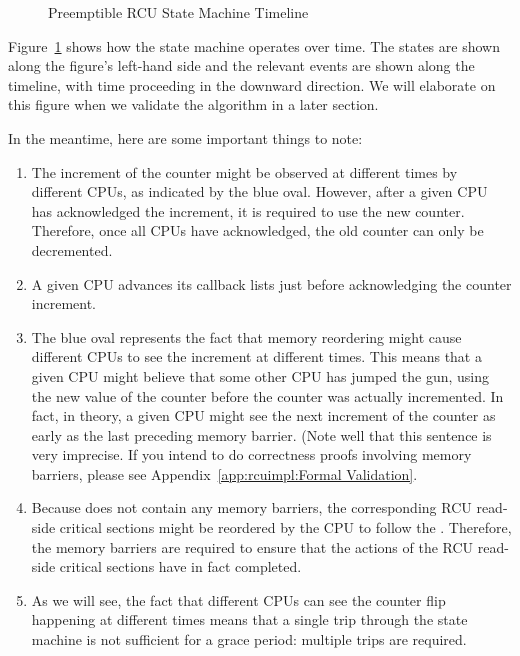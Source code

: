 \begin{figure}[htb]
\centering
{}
\caption{Preemptible RCU State Machine Timeline}
\label{app:rcuimpl:Preemptible RCU State Machine Timeline}
\end{figure}

Figure~\ref{app:rcuimpl:Preemptible RCU State Machine Timeline}
shows how the state machine operates over time.
The states are shown along the figure's left-hand side and the relevant events
are shown along the timeline, with time proceeding in the downward direction.
We will elaborate on this figure when we validate the algorithm in
a later section.

In the meantime, here are some important things to note:

\begin{enumerate}
\item	The increment of the  counter
	might be observed at different times by different CPUs, as
	indicated by the blue oval.  However, after a given
	CPU has acknowledged the increment, it is required to
	use the new counter.
	Therefore, once all CPUs have acknowledged, the old counter
	can only be decremented.
\item	A given CPU advances its callback lists just before
	acknowledging the counter increment.
\item	The blue oval represents the fact that memory reordering
	might cause different CPUs to see the increment at
	different times.
	This means that a given CPU might believe that some
	other CPU has jumped the gun, using the new value of the counter
	before the counter was actually incremented.
	In fact, in theory, a given CPU might see the next increment of the
	 counter as early as
	the last preceding memory barrier.
	(Note well that this sentence is very imprecise.
	If you intend to do correctness proofs involving memory barriers,
	please see Appendix~\ref{app:rcuimpl:Formal Validation}.
\item	Because  does not contain any
	memory barriers, the corresponding RCU read-side critical
	sections might be reordered by the CPU to follow the
	.
	Therefore, the memory barriers are required to ensure
	that the actions of the RCU read-side critical sections
	have in fact completed.
\item	As we will see, the fact that different CPUs can see the
	counter flip happening at different times means that a
	single trip through the state machine is not sufficient
	for a grace period: multiple trips are required.
\end{enumerate}

